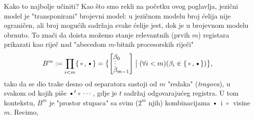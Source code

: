 Kako to najbolje učiniti? Kao što smo rekli na početku ovog poglavlja, jezični model je "transponirani" brojevni model: u jezičnom modelu broj ćelija nije ograničen, ali broj mogućih sadržaja svake ćelije jest, dok je u brojevnom modelu obrnuto. To znači da doista možemo stanje relevantnih (prvih $m$) registara prikazati kao riječ nad "abecedom $m$-bitnih procesorskih riječi"
\begin{equation}
\renewcommand{\arraystretch}{0.1}
    B^m:=\prod_{i<m}\{\text\textopenbullet,\text\textbullet\}=\bigl\{\left[\begin{array}{@{}l@{}}\beta_0\\
    \MTFlushSpaceAbove
    \vdotswithin{\beta}\\
    \beta_{m-1}\end{array}\right]\bigm|(\forall i<m)(\beta_i\in\{\text\textopenbullet,\text\textbullet\})\bigr\}\text,
\end{equation}
tako da se dio trake desno od separatora sastoji od $m$ "redaka" (\emph{tragova}), u svakom od kojih piše $\text\textbullet^t\text\textopenbullet\dotsm$, gdje je $t$ sadržaj odgovarajućeg registra. U tom kontekstu, $B^m$ je "prostor stupaca" sa svim ($2^m$ njih) kombinacijama $\text\textbullet$ i $\text\textopenbullet$ visine $m$. Recimo,
